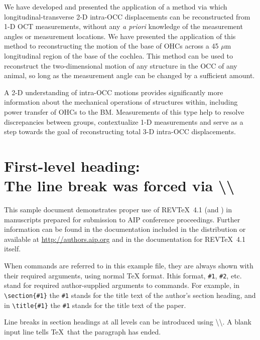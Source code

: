 \documentclass[aip,cp,amsmath,amssymb,reprint]{revtex4-2}
\begin{document}
\par{We have developed and presented the application of a method via which longitudinal-transverse 2-D intra-OCC displacements can be reconstructed from 1-D OCT measurements, without any \textit{a priori} knowledge of the measurement angles or measurement locations. We have presented the application of this method to reconstructing the motion of the base of OHCs across a 45 $\mu$m longitudinal region of the base of the cochlea. This method can be used to reconstruct the two-dimensional motion of any structure in the OCC of any animal, so long as the measurement angle can be changed by a sufficient amount.}
\par{A 2-D understanding of intra-OCC motions provides significantly more information about the mechanical operations of structures within, including power transfer of OHCs to the BM. Measurements of this type help to resolve discrepancies between groups, contextualize 1-D measurements and serve as a step towards the goal of reconstructing total 3-D intra-OCC displacements.}

\section{\label{sec:level1}First-level heading:\protect\\ The line
break was forced \lowercase{via} \textbackslash\textbackslash}

This sample document demonstrates proper use of REV\TeX~4.1 (and
\LaTeXe) in manuscripts prepared for submission to AIP
conference proceedings. Further information can be found in the documentation included in the distribution or available at
\url{http://authors.aip.org} and in the documentation for
REV\TeX~4.1 itself.

When commands are referred to in this example file, they are always
shown with their required arguments, using normal \TeX{} format. Ithis format, \verb+#1+, \verb+#2+, etc. stand for required
author-supplied arguments to commands. For example, in
\verb+\section{#1}+ the \verb+#1+ stands for the title text of the
author's section heading, and in \verb+\title{#1}+ the \verb+#1+
stands for the title text of the paper.

Line breaks in section headings at all levels can be introduced using
\textbackslash\textbackslash. A blank input line tells \TeX\ that the
paragraph has ended.
\end{document}

